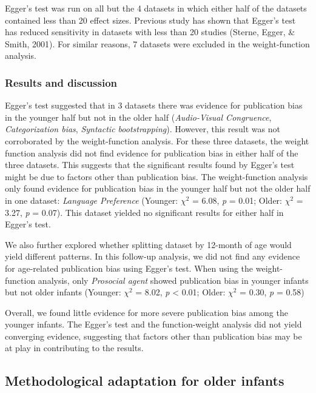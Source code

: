 \documentclass[
  man]{apa6}
\begin{document}
Egger's test was run on all but the 4 datasets in which either half of the datasets contained less than 20 effect sizes. Previous study has shown that Egger's test has reduced sensitivity in datasets with less than 20 studies (Sterne, Egger, \& Smith, 2001). For similar reasons, 7 datasets were excluded in the weight-function analysis.

\hypertarget{results-and-discussion}{%
\subsubsection{Results and discussion}\label{results-and-discussion}}

Egger's test suggested that in 3 datasets there was evidence for publication bias in the younger half but not in the older half (\emph{Audio-Visual Congruence}, \emph{Categorization bias}, \emph{Syntactic bootstrapping}). However, this result was not corroborated by the weight-function analysis. For these three datasets, the weight function analysis did not find evidence for publication bias in either half of the three datasets. This suggests that the significant results found by Egger's test might be due to factors other than publication bias. The weight-function analysis only found evidence for publication bias in the younger half but not the older half in one dataset: \emph{Language Preference} (Younger: \(\chi^2\) = 6.08, \emph{p} = 0.01; Older: \(\chi^2\) = 3.27, \emph{p} = 0.07). This dataset yielded no significant results for either half in Egger's test.

We also further explored whether splitting dataset by 12-month of age would yield different patterns. In this follow-up analysis, we did not find any evidence for age-related publication bias using Egger's test. When using the weight-function analysis, only \emph{Prosocial agent} showed publication bias in younger infants but not older infants (Younger: \(\chi^2\) = 8.02, \emph{p} \textless{} 0.01; Older: \(\chi^2\) = 0.30, \emph{p} = 0.58)

Overall, we found little evidence for more severe publication bias among the younger infants. The Egger's test and the function-weight analysis did not yield converging evidence, suggesting that factors other than publication bias may be at play in contributing to the results.

\hypertarget{methodological-adaptation-for-older-infants}{%
\subsection{Methodological adaptation for older infants}\label{methodological-adaptation-for-older-infants}}
\end{document}
